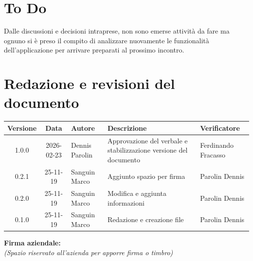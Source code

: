 \documentclass[a4paper,12pt]{article}
\begin{document}
	\section{To Do}
	Dalle discussioni e decisioni intraprese, non sono emerse attivit\`a da fare ma ognuno si \`e preso il compito di analizzare nuovamente le funzionalit\`a dell'applicazione per arrivare preparati al prossimo incontro.
	
	
	\clearpage
	\section{Redazione e revisioni del documento}
	
	\begin{center}
		\small
		\renewcommand{\arraystretch}{1.2} 
		\begin{tabularx}{\textwidth}{|c|c|>{\raggedright\arraybackslash}p{}|>{\raggedright\arraybackslash}X|>{\raggedright\arraybackslash}p{}|}
			\hline
			\rowcolor{gray!60} 
			\textbf{Versione} & \textbf{Data} & \textbf{Autore} & \textbf{Descrizione} & \textbf{Verificatore} \\
			\hline

			\rowcolor{white}
			1.0.0 & 2026-02-23 & Dennis Parolin & Approvazione del verbale e stabilizzazione versione del documento & Ferdinando Fracasso \\
			\hline
			\rowcolor{gray!20}
			0.2.1 & 25-11-19 & Sanguin Marco & Aggiunto spazio per firma & Parolin Dennis\\
			\hline
			\rowcolor{white}
			0.2.0 & 25-11-19 & Sanguin Marco & Modifica e aggiunta informazioni &  Parolin Dennis\\
			\hline
			\rowcolor{gray!20}
			0.1.0 & 25-11-19 & Sanguin Marco & Redazione e creazione file & Parolin Dennis \\
			\hline
			
		\end{tabularx}
	\end{center}

\vspace*{\fill} %
\noindent
\begin{minipage}{0.60\textwidth}
    {\small
    \textbf{Firma aziendale:}\\[0.3cm]
    \textit{(Spazio riservato all’azienda per apporre firma o timbro)}\\[0.8cm]
    \fbox{\rule{0pt}{2.5cm}\rule{5cm}{0pt}} %
    }
\end{minipage}
	
\end{document}

